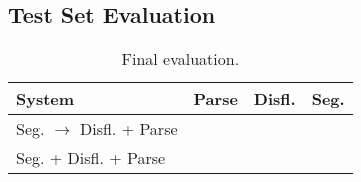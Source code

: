 \documentclass[11pt,letterpaper]{article}
\begin{document}
\subsection{Test Set Evaluation}

\begin{table}
    \centering
    \small
    \begin{tabular}{l|rrr}
        System & Parse & Disfl. & Seg. \\
        \hline \hline
        Seg. $\rightarrow$ Disfl. + Parse & & & \\
        Seg. + Disfl. + Parse  & & & \\
    \end{tabular}
    \caption{\small Final evaluation.}
\end{table}





\end{document}
